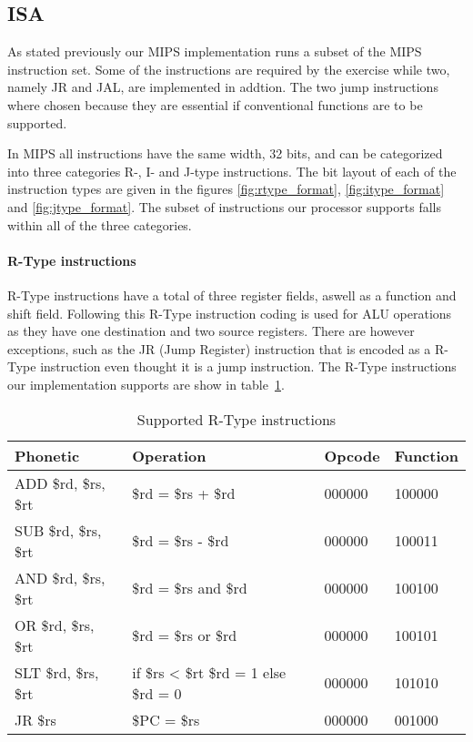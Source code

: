 \subsection{ISA}

As stated previously our MIPS implementation runs a subset of the MIPS instruction set. Some of the instructions are required by the exercise while two, namely JR and JAL, are implemented in addtion. The two jump instructions where chosen because they are essential if conventional functions are to be supported.

In MIPS all instructions have the same width, 32 bits, and can be categorized into three categories R-, I- and J-type instructions. The bit layout of each of the instruction types are given in the figures \ref{fig:rtype_format}, \ref{fig:itype_format} and \ref{fig:jtype_format}. The subset of instructions our processor supports falls within all of the three categories. 

\paragraph{R-Type instructions}

R-Type instructions have a total of three register fields, aswell as a function and shift field. Following this R-Type instruction coding is used for ALU operations as they have one destination and two source registers. There are however exceptions, such as the JR (Jump Register) instruction that is encoded as a R-Type instruction even thought it is a jump instruction. The R-Type instructions our implementation supports are show in table~\ref{table:rtype_instructions}.

\begin{table}[h]
    \begin{tabular}{l|l|l|l}
    Phonetic & Operation & Opcode & Function \\

    \hline
    ADD \$rd, \$rs, \$rt & \$rd = \$rs + \$rd   & 000000 & 100000 \\
    SUB \$rd, \$rs, \$rt & \$rd = \$rs - \$rd   & 000000 & 100011 \\ 
    AND \$rd, \$rs, \$rt & \$rd = \$rs and \$rd & 000000 & 100100 \\ 
    OR  \$rd, \$rs, \$rt & \$rd = \$rs or \$rd  & 000000 & 100101 \\  
    SLT \$rd, \$rs, \$rt & if \$rs < \$rt \$rd = 1 else \$rd = 0  & 000000 & 101010 \\ 
    JR  \$rs             & \$PC = \$rs          & 000000 & 001000 \\ 
    \hline
    \end{tabular}

    \caption{Supported R-Type instructions}
    \label{table:rtype_instructions}
\end{table}

